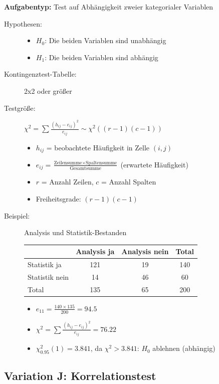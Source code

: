 \documentclass[12pt, a4paper, titlepage, ngerman]{scrartcl}
\begin{document}
\textbf{Aufgabentyp:} Test auf Abhängigkeit zweier kategorialer Variablen

\begin{description}
  \item[Hypothesen:] 
    \begin{itemize}
      \item $H_0$: Die beiden Variablen sind unabhängig
      \item $H_1$: Die beiden Variablen sind abhängig
    \end{itemize}
  \item[Kontingenztest-Tabelle:] 2x2 oder größer
  \item[Testgröße:] $\chi^2 = \sum \frac{(h_{ij} - e_{ij})^2}{e_{ij}} \sim \chi^2((r-1)(c-1))$
    \begin{itemize}
      \item $h_{ij}$ = beobachtete Häufigkeit in Zelle $(i,j)$
      \item $e_{ij} = \frac{\text{Zeilensumme} \times \text{Spaltensumme}}{\text{Gesamtsumme}}$ (erwartete Häufigkeit)
      \item $r$ = Anzahl Zeilen, $c$ = Anzahl Spalten
      \item Freiheitsgrade: $(r-1)(c-1)$
    \end{itemize}
  \item[Beispiel:] Analysis und Statistik-Bestanden
    \begin{table}[h]
      \centering
      \begin{tabular}{l|cc|c}
        & Analysis ja & Analysis nein & Total \\
        \hline
        Statistik ja & 121 & 19 & 140 \\
        Statistik nein & 14 & 46 & 60 \\
        \hline
        Total & 135 & 65 & 200
      \end{tabular}
    \end{table}
    \begin{itemize}
      \item $e_{11} = \frac{140 \times 135}{200} = 94.5$
      \item $\chi^2 = \sum \frac{(h_{ij} - e_{ij})^2}{e_{ij}} = 76.22$
      \item $\chi^2_{0.95}(1) = 3.841$, da $\chi^2 > 3.841$: $H_0$ ablehnen (abhängig)
    \end{itemize}
\end{description}

\subsection{Variation J: Korrelationstest}
\end{document}
